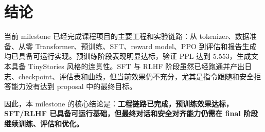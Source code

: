 \documentclass[UTF8,zihao=-4]{ctexart}
\begin{document}
\section{结论}

当前 milestone 已经完成课程项目的主要工程和实验链路：从 tokenizer、数据准备、从零 Transformer、预训练、SFT、reward model、PPO 到评估和报告生成均已具备可运行实现。预训练阶段表现明显达标，验证 PPL 达到 5.553，生成文本具备 TinyStories 风格的连贯性。SFT 与 RLHF 阶段虽然已经跑通并产出日志、checkpoint、评估表和曲线，但当前效果仍不充分，尤其是指令跟随和安全拒答能力没有达到 proposal 中的最终目标。

因此，本 milestone 的核心结论是：\textbf{工程链路已完成，预训练效果达标，SFT/RLHF 已具备可运行基础，但最终对话和安全对齐能力仍需在 final 阶段继续训练、评估和优化。}
\end{document}
